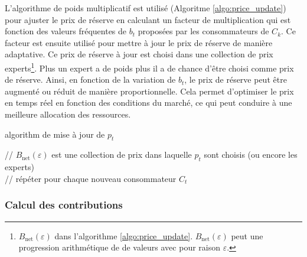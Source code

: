 L'algorithme de poids multiplicatif est utilisé (Algoritme \ref{algo:price_update}) pour ajuster le prix de réserve en calculant un facteur de multiplication qui est fonction des valeurs fréquentes de $b_t$ proposées par les consommateurs de $C_k$. Ce facteur est ensuite utilisé pour mettre à jour le prix de réserve de manière adaptative. Ce prix de réserve à jour est choisi dans une collection de prix experts\footnote{$B_{\text{net}}(\varepsilon)$ dans l'algorithme \autoref{algo:price_update}. $B_{\text{net}}(\varepsilon)$ peut une progression arithmétique de de valeurs avec pour raison $\varepsilon$.}. Plus un expert a de poids plus il a de chance d'être choisi comme prix de réserve. Ainsi, en fonction de la variation de $b_t$, le prix de réserve peut être augmenté ou réduit de manière proportionnelle. Cela permet d'optimiser le prix en temps réel en fonction des conditions du marché, ce qui peut conduire à une meilleure allocation des ressources.


\begin{algorithm}[h] \label{algo:price_update}
\caption{algorithm de mise à jour de $p_t$}
// $B_{\text{net}}(\varepsilon)$ est une collection de prix dans laquelle $p_t$ sont choisis (ou encore les experts) \\
// répéter pour chaque nouveau consommateur $C_t$ \\
\end{algorithm}



\subsubsection{Calcul des contributions} \label{subsubsec:calcul_contrib}

